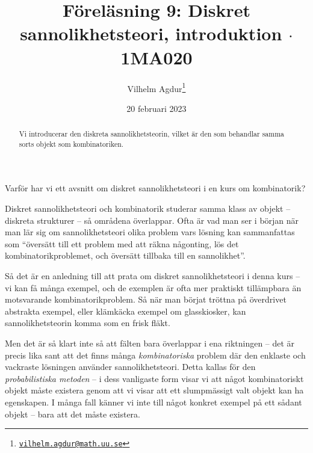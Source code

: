 \documentclass[nobib]{tufte-handout}
\title{Föreläsning 9: Diskret sannolikhetsteori, introduktion $\cdot$ 1MA020}
\author[Vilhelm Agdur]{Vilhelm Agdur\thanks{\href{mailto:vilhelm.agdur@math.uu.se}{\nolinkurl{vilhelm.agdur@math.uu.se}}}}
\date{20 februari 2023}
\begin{document}

\maketitle%

\begin{abstract}
\noindent
Vi introducerar den diskreta sannolikhetsteorin, vilket är den som behandlar samma sorts objekt som kombinatoriken.
\end{abstract}

Varför har vi ett avsnitt om diskret sannolikhetsteori i en kurs om kombinatorik? 

Diskret sannolikhetsteori och kombinatorik studerar samma klass av objekt -- diskreta strukturer -- så områdena överlappar. Ofta är vad man ser i början när man lär sig om sannolikhetsteori olika problem vars lösning kan sammanfattas som ``översätt till ett problem med att räkna någonting, lös det kombinatorikproblemet, och översätt tillbaka till en sannolikhet''. 

Så det är en anledning till att prata om diskret sannolikhetsteori i denna kurs -- vi kan få många exempel, och de exemplen är ofta mer praktiskt tillämpbara än motsvarande kombinatorikproblem. Så när man börjat tröttna på överdrivet abstrakta exempel, eller klämkäcka exempel om glasskiosker, kan sannolikhetsteorin komma som en frisk fläkt.

Men det är så klart inte så att fälten bara överlappar i ena riktningen -- det är precis lika sant att det finns många \emph{kombinatoriska} problem där den enklaste och vackraste lösningen använder sannolikhetsteori. Detta kallas för den \emph{probabilistiska metoden} -- i dess vanligaste form visar vi att något kombinatoriskt objekt måste existera genom att vi visar att ett slumpmässigt valt objekt kan ha egenskapen. I många fall känner vi inte till något konkret exempel på ett sådant objekt -- bara att det måste existera.
\end{document}
